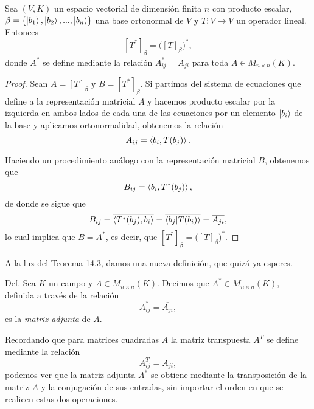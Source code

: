 \documentclass[12pt,dvipsnames]{article}
\newenvironment{teorema}[2][Teorema]{\begin{trivlist}
\item[\hskip \labelsep {\bfseries #1}\hskip \labelsep {\bfseries #2.}]}{\end{trivlist}}
\begin{document}
\begin{teorema} {14.3}
Sea $(V,K)$ un espacio vectorial de dimensión finita $n$ con producto escalar, $\beta=\{\ket{b_1},\ket{b_2},...,\ket{b_n}\}$ una base ortonormal de $V$ y $T:V\to V$ un operador lineal. Entonces $$[T^*]_\beta=\big([T]_\beta\big)^*,$$ donde $A^*$ se define mediante la relación $A^*_{ij}=\overline{A_{ji}}$ para toda $A\in M_{n\times n}(K)$.
\begin{proof}
Sean $A=[T]_\beta$ y $B=[T^*]_\beta$. Si partimos del sistema de ecuaciones que define a la representación matricial $A$ y hacemos producto escalar por la izquierda en ambos lados de cada una de las ecuaciones por un elemento $\ket{b_i}$ de la base y aplicamos ortonormalidad, obtenemos la relación $$A_{ij}=\braket{b_i,T(b_j)}.$$ 

Haciendo un procedimiento análogo con la representación matricial $B$, obtenemos que $$B_{ij}=\braket{b_i,T^*(b_j)},$$ de donde se sigue que $$B_{ij}=\overline{\braket{T^*(b_j),b_i}}=\overline{\braket{b_j|T(b_i)}}=\overline{A_{ji}},$$ lo cual implica que $B=A^*$, es decir, que $[T^*]_\beta=\big([T]_\beta\big)^*$.
\end{proof}
\end{teorema}

A la luz del Teorema 14.3, damos una nueva definición, que quizá ya esperes.

\vspace{5mm}
\begin{tcolorbox}
\underline{Def.} Sea $K$ un campo y $A\in M_{n\times n}(K)$. Decimos que $A^*\in M_{n\times n}(K)$, definida a través de la relación $$A^*_{ij}=\overline{A_{ji}},$$ es la \emph{matriz adjunta} de $A$.
\end{tcolorbox}
\vspace{5mm}

\noindent Recordando que para matrices cuadradas $A$ la matriz transpuesta $A^T$ se define mediante la relación $$A^T_{ij}=A_{ji},$$ podemos ver que la matriz adjunta $A^*$ se obtiene mediante la transposición de la matriz $A$ y la conjugación de sus entradas, sin importar el orden en que se realicen estas dos operaciones.
\end{document}
